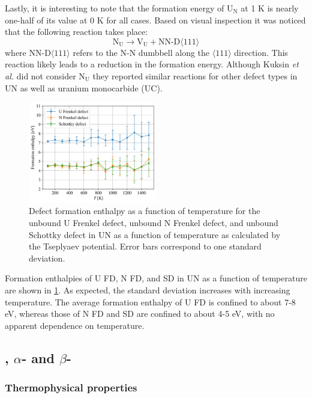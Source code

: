 \documentclass[preprint, 12pt]{elsarticle}
\begin{document}
Lastly, it is interesting to note that the formation energy of U$_\text{N}$ at 1 K is nearly one-half of its value at 0 K for all cases. Based on visual inspection it was noticed that the following reaction takes place:
\begin{equation}
\text{N}_\text{U} \rightarrow \text{V}_\text{U} + \text{NN-D} \langle 111 \rangle
\end{equation}
where NN-D$\langle 111 \rangle$ refers to the N-N dumbbell along the $\langle 111 \rangle$ direction. This reaction likely leads to a reduction in the formation energy. Although Kuksin \textit{et al.} \cite{Kuksin2016} did not consider N$_\text{U}$ they reported similar reactions for other defect types in UN as well as uranium monocarbide (UC).

\begin{figure}[h!]
    \centering
    \includegraphics[width=0.50\textwidth]{FD-SD-T.png}
    \caption{Defect formation enthalpy as a function of temperature for the unbound U Frenkel defect, unbound N Frenkel defect, and unbound Schottky defect in UN as a function of temperature as calculated by the Tseplyaev potential. Error bars correspond to one standard deviation.}
    \label{Fig:EfvsT}
\end{figure}

Formation enthalpies of U FD, N FD, and SD in UN as a function of temperature are shown in \cref{Fig:EfvsT}. As expected, the standard deviation increases with increasing temperature. The average formation enthalpy of U FD is confined to about 7-8 eV, whereas those of N FD and SD are confined to about 4-5 eV, with no apparent dependence on temperature.

\subsection{, $\alpha$- and $\beta$-}

\subsubsection{Thermophysical properties}
\end{document}
